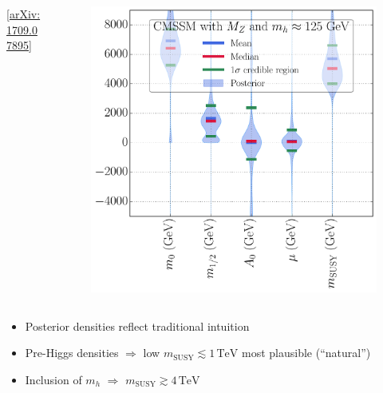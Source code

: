 \documentclass[10pt,aspectratio=169]{beamer}
\newcommand{\msusy}{\ensuremath{m_{\text{SUSY}}}\xspace}
\newcommand{\tev}{\ensuremath{\,\text{TeV}}\xspace}
\begin{document}
\begin{frame}
\begin{columns}[t]
\begin{column}{0.3\textwidth}
\begin{figure}
      \end{figure}
      \vspace{-15pt}
      \begin{center}
        \tiny [\href{http://arxiv.org/abs/1709.07895}{arXiv:1709.07895}]
      \end{center}
    \end{column}
    \begin{column}{0.3\textwidth}
      \vspace{-20pt}
      \begin{figure}
        \centering
        \includegraphics[width=\textwidth]{CMSSM_mzmh_violin}
      \end{figure}
    \end{column}
  \end{columns}
  \begin{columns}[t]
    \begin{column}{0.5\textwidth}
      \begin{itemize} \itemsep0.7em
      \item {\color{blue} Posterior densities reflect traditional
        intuition}
      \item Pre-Higgs densities $\Rightarrow$ low $\msusy \lesssim
        1 \tev$ most plausible (``natural'')
      \item Inclusion of $m_h$ $\Rightarrow$ $\msusy \gtrsim 4 \tev$

\end{itemize}
\end{column}
\end{columns}
\end{frame}
\end{document}
